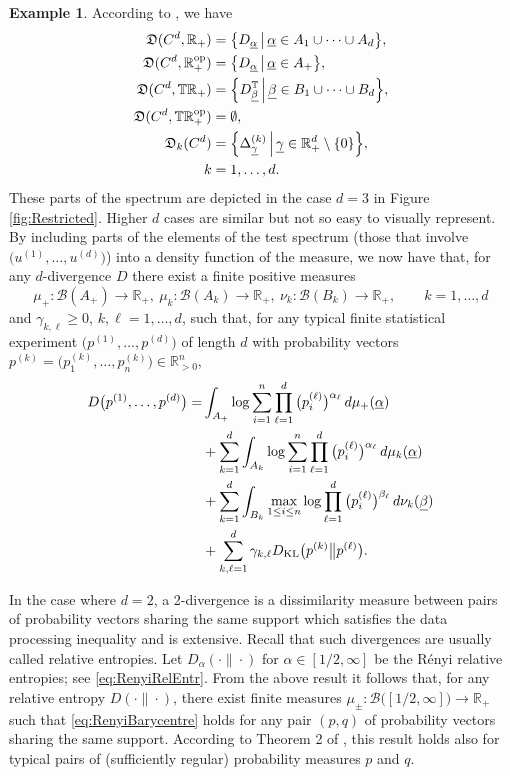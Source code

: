 \documentclass[12pt,a4paper,reqno]{amsart}
\theoremstyle{definition}
\newtheorem{example}[proposition]{Example}
\newcommand{\mc}[1]{\mathcal{#1}}
\newcommand{\mf}[1]{\mathfrak{#1}}
\newcommand{\R}{\mathbb R}
\newcommand{\T}{\mathbb T}
\let\originalleft\left
\let\originalright\right
\renewcommand{\left}{\mathopen{}\mathclose\bgroup\originalleft}
\renewcommand{\right}{\aftergroup\egroup\originalright}
\begin{document}
\begin{example}
According to \cite{Farooq_et_al_2024}, we have
\begin{align*}
\mf D(C^d,\R_+)&=\left\{D_{\underline{\alpha}}\,\middle|\,\underline{\alpha}\in A_1\cup\cdots\cup A_d\right\},\\
\mf D(C^d,\R_+^{\rm op})&=\left\{D_{\underline{\alpha}}\,\middle|\,\underline{\alpha}\in A_+\right\},\\
\mf D(C^d,\T\R_+)&=\left\{D^\T_{\underline{\beta}}\,\middle|\,\underline{\beta}\in B_1\cup\cdots\cup B_d\right\},\\
\mf D(C^d,\T\R_+^{\rm op})&=\emptyset,\\
\mf D_k(C^d)&=\left\{\Delta^{(k)}_{\underline{\gamma}}\,\middle|\,\underline{\gamma}\in\R_+^d\setminus\{0\}\right\},\\
k&=1,\ldots,d.
\end{align*}
These parts of the spectrum are depicted in the case $d=3$ in Figure \ref{fig:Restricted}. Higher $d$ cases are similar but not so easy to visually represent. By including parts of the elements of the test spectrum (those that involve $\big(u^{(1)},\ldots,u^{(d)}\big)$) into a density function of the measure, we now have that, for any $d$-divergence $D$ there exist a finite positive measures
$$
\mu_+:\mc B(A_+)\to\R_+,\ \mu_k:\mc B(A_k)\to\R_+,\ \nu_k:\mc B(B_k)\to\R_+,\qquad k=1,\ldots,d
$$
and $\gamma_{k,\ell}\geq0$, $k,\ell=1,\ldots,d$, such that, for any typical finite statistical experiment $\big(p^{(1)},\ldots,p^{(d)}\big)$ of length $d$ with probability vectors $p^{(k)}=\big(p^{(k)}_1,\ldots,p^{(k)}_n\big)\in\R_{>0}^n$,
\begin{align*}
D\big(p^{(1)},\ldots,p^{(d)}\big)=&\int_{A_+}\log{\sum_{i=1}^n\prod_{\ell=1}^d\big(p^{(\ell)}_i\big)^{\alpha_\ell}}\,d\mu_+(\underline{\alpha})\\
&+\sum_{k=1}^d\int_{A_k}\log{\sum_{i=1}^n\prod_{\ell=1}^d\big(p^{(\ell)}_i\big)^{\alpha_\ell}}\,d\mu_k(\underline{\alpha})\\
&+\sum_{k=1}^d\int_{B_k}\max_{1\leq i\leq n}\log{\prod_{\ell=1}^d\big(p^{(\ell)}_i\big)^{\beta_\ell}}\,d\nu_k(\underline{\beta})\\
&+\sum_{k,\ell=1}^d \gamma_{k,\ell}D_{\rm KL}\big(p^{(k)}\big\|p^{(\ell)}\big).
\end{align*}

In the case where $d=2$, a 2-divergence is a dissimilarity measure between pairs of probability vectors sharing the same support which satisfies the data processing inequality and is extensive. Recall that such divergences are usually called relative entropies. Let $D_\alpha(\cdot\|\cdot)$ for $\alpha\in[1/2,\infty]$ be the R\'{e}nyi relative entropies; see \eqref{eq:RenyiRelEntr}. From the above result it follows that, for any relative entropy $D(\cdot\|\cdot)$, there exist finite measures $\mu_\pm:\mc B\big([1/2,\infty])\to\R_+$ such that \eqref{eq:RenyiBarycentre} holds for any pair $(p,q)$ of probability vectors sharing the same support. According to Theorem 2 of \cite{Mu_et_al_2021}, this result holds also for typical pairs of (sufficiently regular) probability measures $p$ and $q$.
\end{example}
\end{document}

